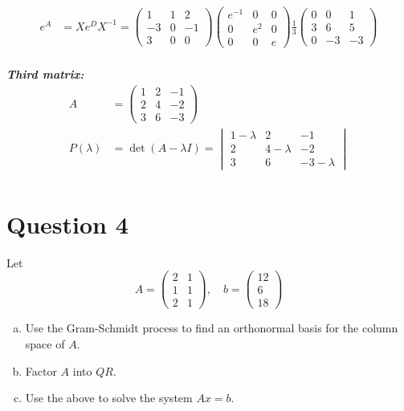 \documentclass{article}
\begin{document}
\begin{align*}
    \\
    e^A &= Xe^DX^{-1} = \begin{pmatrix} 1 & 1 & 2 \\ -3 & 0 & -1 \\ 3 & 0 & 0 \end{pmatrix} \begin{pmatrix} e^{-1} & 0 & 0 \\ 0 & e^2 & 0 \\ 0 & 0 & e \end{pmatrix} \frac{1}{3} \begin{pmatrix} 0 & 0 & 1 \\ 3 & 6 & 5 \\ 0 & -3 & -3 \end{pmatrix} \\
\end{align*}

\newpage
\noindent\textbf{\textit{Third matrix:}}
\begin{align*}
    A &= \begin{pmatrix} 1 & 2 & -1 \\ 2 & 4 & -2 \\ 3 & 6 & -3 \end{pmatrix} \\
    P(\lambda) &= \det(A - \lambda I) = \begin{vmatrix} 1 - \lambda & 2 & -1 \\ 2 & 4 - \lambda & -2 \\ 3 & 6 & -3 - \lambda \end{vmatrix} \\
\end{align*}

\newpage
\section*{Question 4}
Let 
$$ A = \begin{pmatrix} 2 & 1 \\ 1 & 1 \\ 2 & 1 \end{pmatrix}, \quad
   b = \begin{pmatrix} 12 \\ 6 \\ 18 \end{pmatrix} $$
\begin{enumerate}[a.]
    \item Use the Gram-Schmidt process to find an orthonormal basis for the column space of $A$.
    \item Factor $A$ into $QR$.
    \item Use the above to solve the system $Ax = b$.
\end{enumerate}
\end{document}
